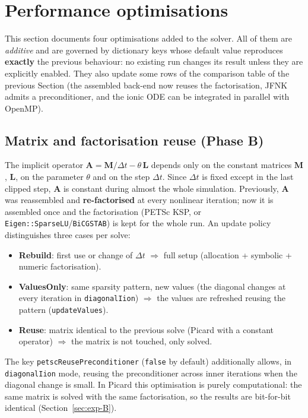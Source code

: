 \documentclass[11pt,a4paper]{article}
\newcommand{\code}[1]{\texttt{\small #1}}
\newcommand{\Mmass}{\mathbf{M}}
\newcommand{\Lop}{\mathbf{L}}
\newcommand{\Aimp}{\mathbf{A}}
\newcommand{\dictkey}[1]{\textcolor{black!60!green}{\texttt{\footnotesize #1}}}
\begin{document}
\section{Performance optimisations}
\label{sec:optim}

This section documents four optimisations added to the solver. All of them are
\emph{additive} and are governed by dictionary keys whose default
value reproduces \textbf{exactly} the previous behaviour: no existing
run changes its result unless they are explicitly enabled. They also update
some rows of the comparison table of the previous Section (the assembled
back-end now reuses the factorisation, JFNK admits a preconditioner,
and the ionic ODE can be integrated in parallel with OpenMP).

\subsection{Matrix and factorisation reuse (Phase B)}
\label{sec:optim-B}

The implicit operator $\Aimp = \Mmass/\Delta t - \theta\,\Lop$ depends only on the
constant matrices $\Mmass$, $\Lop$, on the parameter $\theta$ and on the step $\Delta t$.
Since $\Delta t$ is fixed except in the last clipped step, $\Aimp$ is constant
during almost the whole simulation. Previously, $\Aimp$ was reassembled and
\textbf{re-factorised} at every nonlinear iteration; now it is assembled once and the
factorisation (PETSc KSP, or \code{Eigen::SparseLU}/\code{BiCGSTAB}) is kept
for the whole run. An update policy distinguishes three cases per solve:
\begin{itemize}[nosep]
  \item \textbf{Rebuild}: first use or change of $\Delta t$ $\Rightarrow$ full
        setup (allocation + symbolic + numeric factorisation).
  \item \textbf{ValuesOnly}: same sparsity pattern, new values (the
        diagonal changes at every iteration in \dictkey{diagonalIion}) $\Rightarrow$ the
        values are refreshed reusing the pattern (\code{updateValues}).
  \item \textbf{Reuse}: matrix identical to the previous solve (Picard with a constant
        operator) $\Rightarrow$ the matrix is not touched, only solved.
\end{itemize}
The key \dictkey{petscReusePreconditioner} (\code{false} by default) additionally
allows, in \dictkey{diagonalIion} mode, reusing the preconditioner across
inner iterations when the diagonal change is small. In Picard this
optimisation is purely computational: the same matrix is solved with the same
factorisation, so the results are bit-for-bit identical
(Section~\ref{sec:exp-B}).
\end{document}

